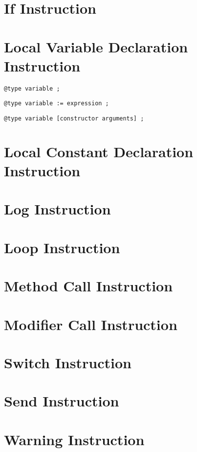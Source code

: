 \section{If Instruction}


\section{Local Variable Declaration Instruction}


{
\begin{lstlisting}[language=galgas]
@type variable ;
\end{lstlisting}
}

{
\begin{lstlisting}[language=galgas]
@type variable := expression ;
\end{lstlisting}
}

{
\begin{lstlisting}[language=galgas]
@type variable [constructor arguments] ;
\end{lstlisting}
}


\section{Local Constant Declaration Instruction}




\section{Log Instruction}




\section{Loop Instruction}




\section{Method Call Instruction}




\section{Modifier Call Instruction}




\section{Switch Instruction}




\section{Send Instruction}




\section{Warning Instruction}


